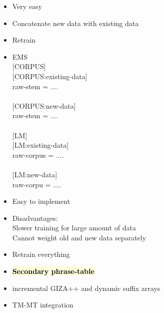 \documentclass[landscape]{uedslides2C}
\newcommand{\currenttopic}[1]{\colorbox{lightyellow}{\textcolor{black}{\bf #1}}}
\begin{document}

\begin{itemize}
\item Very easy
\item Concatenate new data with existing data
\item Retrain
\item EMS 
      \\ {[}CORPUS{]}
      \\ {[}CORPUS:existing-data{]}
      \\ raw-stem = ....
      \\
      \\ {[}CORPUS:new-data{]}
      \\ raw-stem = ....
      \\
      \\ {[}LM{]}
      \\ {[}LM:existing-data{]}
      \\ raw-corpus = ....
      \\
      \\ {[}LM:new-data{]}
      \\ raw-corpu = ....

\item Easy to implement
\item Disadvantages: 
    \\ Slower training for large amount of data
    \\ Cannot weight old and new data separately

\end{itemize}


\begin{itemize}
\item Retrain everything
\item \currenttopic{Secondary phrase-table}
\item  incremental GIZA++ and dynamic suffix arrays
\item TM-MT integration

\end{itemize}

\end{document}
